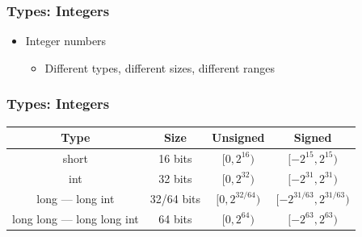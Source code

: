 \documentclass{../c-lecture}
\begin{document}
\begin{frame}
  \frametitle{Types: Integers}
  \begin{itemize}
    \item Integer numbers
    \begin{itemize}
      \item Different types, different sizes, different ranges
    \end{itemize}
  \end{itemize}
\end{frame}

\begin{frame}
  \frametitle{Types: Integers}
  \begin{table}
  \begin{tabular}{cccc}
    \toprule

    Type &
    Size &
    Unsigned &
    Signed \\

    \midrule

    short &
    16 bits &
    $[0, 2^{16})$ &
    $[-2^{15}, 2^{15})$ \\

    \midrule

    int &
    32 bits &
    $[0, 2^{32})$ &
    $[-2^{31}, 2^{31})$ \\

    \midrule

    long --- long int &
    32/64 bits &
    $[0, 2^{32/64})$ &
    $[-2^{31/63}, 2^{31/63})$ \\

    \midrule

    long long --- long long int &
    64 bits &
    $[0, 2^{64})$ &
    $[-2^{63}, 2^{63})$ \\

    \bottomrule
  \end{tabular}
  \end{table}
\end{frame}
\end{document}
